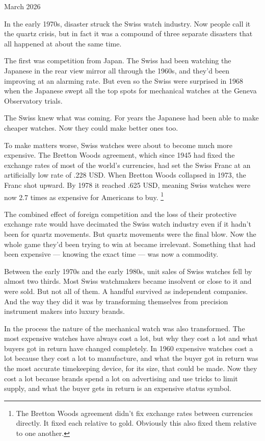 \documentclass[12pt]{book}
\begin{document}
March 2026

In the early 1970s, disaster struck the Swiss watch industry. Now people
call it the quartz crisis, but in fact it was a compound of three
separate disasters that all happened at about the same time.

The first was competition from Japan. The Swiss had been watching the
Japanese in the rear view mirror all through the 1960s, and they'd been
improving at an alarming rate. But even so the Swiss were surprised in
1968 when the Japanese swept all the top spots for mechanical watches at
the Geneva Observatory trials.

The Swiss knew what was coming. For years the Japanese had been able to
make cheaper watches. Now they could make better ones too.

To make matters worse, Swiss watches were about to become much more
expensive. The Bretton Woods agreement, which since 1945 had fixed the
exchange rates of most of the world's currencies, had set the Swiss
Franc at an artificially low rate of .228 USD. When Bretton Woods
collapsed in 1973, the Franc shot upward. By 1978 it reached .625 USD,
meaning Swiss watches were now 2.7 times as expensive for Americans to
buy. \footnote{The Bretton Woods agreement didn't fix exchange rates between
currencies directly. It fixed each relative to gold. Obviously this also
fixed them relative to one another.}

The combined effect of foreign competition and the loss of their
protective exchange rate would have decimated the Swiss watch industry
even if it hadn't been for quartz movements. But quartz movements were
the final blow. Now the whole game they'd been trying to win at became
irrelevant. Something that had been expensive --- knowing the exact time
--- was now a commodity.

Between the early 1970s and the early 1980s, unit sales of Swiss watches
fell by almost two thirds. Most Swiss watchmakers became insolvent or
close to it and were sold. But not all of them. A handful survived as
independent companies. And the way they did it was by transforming
themselves from precision instrument makers into luxury brands.

In the process the nature of the mechanical watch was also transformed.
The most expensive watches have always cost a lot, but why they cost a
lot and what buyers got in return have changed completely. In 1960
expensive watches cost a lot because they cost a lot to manufacture, and
what the buyer got in return was the most accurate timekeeping device,
for its size, that could be made. Now they cost a lot because brands
spend a lot on advertising and use tricks to limit supply, and what the
buyer gets in return is an expensive status symbol.
\end{document}
